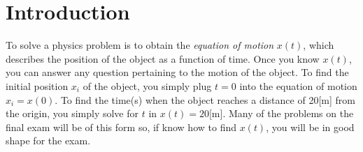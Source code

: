 \documentclass[letterpaper,9pt,journal]{IEEEtran}
\begin{document}

\section*{Introduction}

%



To solve a physics problem is to obtain the \emph{equation of motion} $x(t)$, 
which describes the position of the object as a function of time.
%
Once you know $x(t)$, you can answer any question pertaining to the motion of the object.
To find the initial position $x_i$ of the object, you simply plug $t=0$ into the equation of motion $x_i = x(0)$.
To find the time(s) when the object reaches a distance of 20[m] from the origin, you simply solve for $t$ in $x(t)=20$[m].
Many of the problems on the final exam will be of this form so,
if know how to find $x(t)$,
you will be in good shape for the exam.

\vspace{-3mm}
\end{document}
